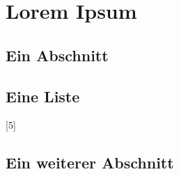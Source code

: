 \chapter{Lorem Ipsum}

\section{Ein Abschnitt}

\Blindtext

\section{Eine Liste}

[5]

\section{Ein weiterer Abschnitt}

\Blindtext